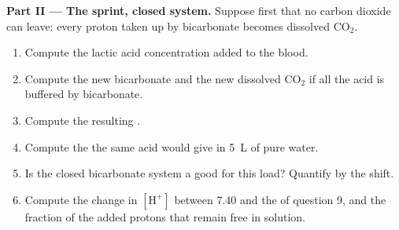 \begin{problem}
\medskip
\noindent\textbf{Part II --- The sprint, closed system.}
Suppose first that no carbon dioxide can leave: every proton taken up
by bicarbonate becomes dissolved $\mathrm{CO_2}$.
\begin{enumerate}[resume]
  \item Compute the lactic acid concentration added to the blood.
  \item Compute the new bicarbonate and the new dissolved
        $\mathrm{CO_2}$ if all the acid is buffered by bicarbonate.
  \item Compute the resulting .
  \item Compute the  the same acid would give in \qty{5}{L} of pure
        water.
  \item Is the closed bicarbonate system a good  for this load?
        Quantify by the  shift.
  \item Compute the change in $[\mathrm{H^+}]$ between  7.40 and the
         of question 9, and the fraction of the added protons that
        remain free in solution.
\end{enumerate}


\end{problem}
